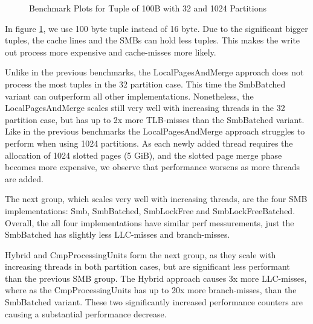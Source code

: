 \begin{figure}[h]
  \centering
  \begin{subfigure}{.49\textwidth}
    \centering
    \resizebox{\linewidth}{!}{}
  \end{subfigure}
  \begin{subfigure}{.49\textwidth}
    \centering
    \resizebox{\linewidth}{!}{}
  \end{subfigure}
  \begin{subfigure}{\textwidth}
    \centering
    \resizebox{\linewidth}{!}{}
  \end{subfigure}
  \caption[Shuffle Benchmark Plots for Tuple of 100B with 32 and 1024 Partitions]{Benchmark Plots for Tuple of 100B with 32 and 1024 Partitions}
  \label{plot-shuffle-100B-32-1024}
\end{figure}

In figure \ref{plot-shuffle-100B-32-1024}, we use 100 byte tuple instead of 16 byte.
Due to the significant bigger tuples, the cache lines and the \acp{SMB} can hold less tuples.
This makes the write out process more expensive and cache-misses more likely.

Unlike in the previous benchmarks, the LocalPagesAndMerge approach does not process the most tuples in the 32 partition case.
This time the SmbBatched variant can outperform all other implementations.
Nonetheless, the LocalPagesAndMerge scales still very well with increasing threads in the 32 partition case, but has up to 2x more \ac{TLB}-misses than the SmbBatched variant.
Like in the previous benchmarks the LocalPagesAndMerge approach struggles to perform when using 1024 partitions.
As each newly added thread requires the allocation of 1024 slotted pages (5 GiB), and the slotted page merge phase becomes more expensive, we observe that performance worsens as more threads are added.

The next group, which scales very well with increasing threads, are the four \ac{SMB} implementations: Smb, SmbBatched, SmbLockFree and SmbLockFreeBatched.
Overall, the all four implementations have similar perf messurements, just the SmbBatched has slightly less \ac{LLC}-misses and branch-misses.

Hybrid and CmpProcessingUnits form the next group, as they scale with increasing threads in both partition cases, but are significant less performant than the previous \ac{SMB} group.
The Hybrid approach causes 3x more \ac{LLC}-misses, where as the CmpProcessingUnits has up to 20x more branch-misses, than the SmbBatched variant.
These two significantly increased performance counters are causing a substantial performance decrease.

